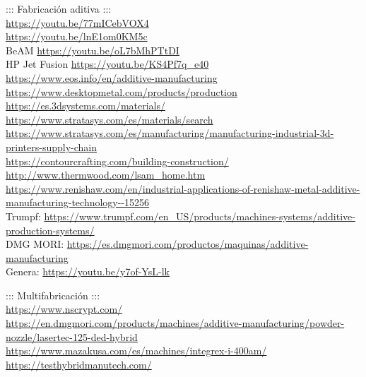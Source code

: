 \documentclass[spanish,12pt,a4paper,final,oneside]{book}
\begin{document}
::: Fabricación aditiva :::
\\ \url{https://youtu.be/77mICebVOX4}
\\ \url{https://youtu.be/lnE1om0KM5c}
\\ BeAM \url{https://youtu.be/oL7bMhPTtDI}
\\ HP Jet Fusion \url{https://youtu.be/KS4Pf7q_e40}
\\ \url{https://www.eos.info/en/additive-manufacturing}
\\ \url{https://www.desktopmetal.com/products/production}
\\ \url{https://es.3dsystems.com/materials/}
\\ \url{https://www.stratasys.com/es/materials/search}
\\ \url{https://www.stratasys.com/es/manufacturing/manufacturing-industrial-3d-printers-supply-chain}
\\ \url{https://contourcrafting.com/building-construction/}
\\ \url{http://www.thermwood.com/lsam_home.htm}
\\ \url{https://www.renishaw.com/en/industrial-applications-of-renishaw-metal-additive-manufacturing-technology--15256}
\\ Trumpf: \url{https://www.trumpf.com/en_US/products/machines-systems/additive-production-systems/}
\\ DMG MORI: \url{https://es.dmgmori.com/productos/maquinas/additive-manufacturing}
\\Genera: \url{https://youtu.be/y7of-YsL-lk}

::: Multifabricación :::
\\ \url{https://www.nscrypt.com/}
\\ {\footnotesize \url{https://en.dmgmori.com/products/machines/additive-manufacturing/powder-nozzle/lasertec-125-ded-hybrid}}
\\ \url{https://www.mazakusa.com/es/machines/integrex-i-400am/}
\\ \url{https://testhybridmanutech.com/}
\end{document}
